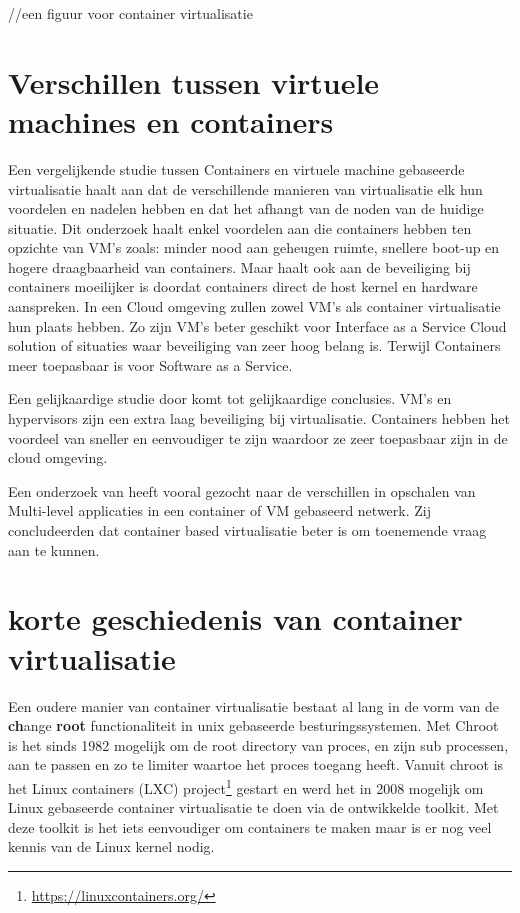 //een figuur voor container virtualisatie

\section{Verschillen tussen virtuele machines en containers}
Een vergelijkende studie tussen Containers en virtuele machine gebaseerde virtualisatie\autocite{Yadav2018} haalt aan dat de verschillende manieren van virtualisatie elk hun voordelen en nadelen hebben en dat het afhangt van de noden van de huidige situatie. Dit onderzoek haalt enkel voordelen aan die containers hebben ten opzichte van VM’s zoals: minder nood aan geheugen ruimte, snellere boot-up en hogere draagbaarheid van containers. Maar haalt ook aan de beveiliging bij containers moeilijker is doordat containers direct de host kernel en hardware aanspreken. In een Cloud omgeving zullen zowel VM’s als container virtualisatie hun plaats hebben. Zo zijn VM’s beter geschikt voor Interface as a Service Cloud solution of situaties waar beveiliging van zeer hoog belang is. Terwijl Containers meer toepasbaar is voor Software as a Service.

Een gelijkaardige studie door \textcite{Eder2018} komt tot gelijkaardige conclusies. VM’s en hypervisors zijn een extra laag beveiliging bij virtualisatie. Containers hebben het voordeel van sneller en eenvoudiger te zijn waardoor ze zeer toepasbaar zijn in de cloud omgeving.

Een onderzoek van \textcite{Abdullah2019} heeft vooral gezocht naar de verschillen in opschalen van Multi-level applicaties in een container of VM gebaseerd netwerk. Zij concludeerden dat container based virtualisatie beter is om toenemende vraag aan te kunnen.


\section{korte geschiedenis van container virtualisatie}
Een oudere manier van container virtualisatie bestaat al lang in de vorm van de \textbf{ch}ange \textbf{root} functionaliteit in unix gebaseerde besturingssystemen. Met Chroot is het sinds 1982 mogelijk om de root directory van proces, en zijn sub processen, aan te passen en zo te limiter waartoe het proces toegang heeft. Vanuit chroot is het Linux containers (LXC) project\footnote{\url{https://linuxcontainers.org/}} gestart en werd het in 2008 mogelijk om Linux gebaseerde container virtualisatie te doen via de ontwikkelde toolkit. Met deze toolkit is het iets eenvoudiger om containers te maken maar is er nog veel kennis van de Linux kernel nodig.\autocite{Eder2016,SenthilKumaran2017}
